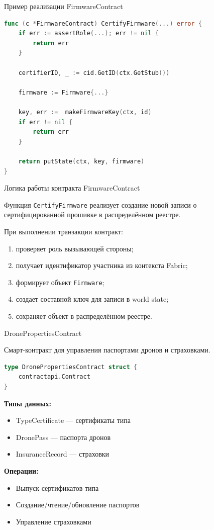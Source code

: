 \documentclass[aspectratio=169]{beamer}
\begin{document}
\begin{frame}[fragile]{Пример реализации FirmwareContract}
\begin{lstlisting}[language=Go]
func (c *FirmwareContract) CertifyFirmware(...) error {
    if err := assertRole(...); err != nil {
        return err
    }

    certifierID, _ := cid.GetID(ctx.GetStub())

    firmware := Firmware{...}

    key, err :=  makeFirmwareKey(ctx, id)
    if err != nil {
        return err
    }

    return putState(ctx, key, firmware)
}
\end{lstlisting}

\end{frame}

\begin{frame}{Логика работы контракта FirmwareContract}

Функция \texttt{CertifyFirmware} реализует создание новой записи
о сертифицированной прошивке в распределённом реестре.

При выполнении транзакции контракт:

\begin{enumerate}\setlength\itemsep{0.5em}
\item проверяет роль вызывающей стороны;
\item получает идентификатор участника из контекста Fabric;
\item формирует объект \texttt{Firmware};
\item создает составной ключ для записи в world state;
\item сохраняет объект в распределённом реестре.
\end{enumerate}


\end{frame}

\begin{frame}[fragile]{DronePropertiesContract}

Смарт-контракт для управления паспортами дронов и страховками.

\begin{lstlisting}[language=Go]
type DronePropertiesContract struct {
	contractapi.Contract
}
\end{lstlisting}

\textbf{Типы данных:}
\begin{itemize}
\item TypeCertificate — сертификаты типа
\item DronePass — паспорта дронов
\item InsuranceRecord — страховки
\end{itemize}

\textbf{Операции:}
\begin{itemize}
\item Выпуск сертификатов типа
\item Создание/чтение/обновление паспортов
\item Управление страховками
\end{itemize}

\end{frame}
\end{document}
